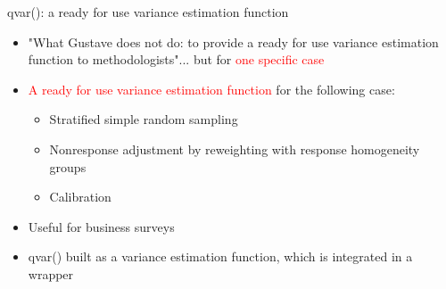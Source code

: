 \documentclass[xcolor=dvipsnames]{beamer}
\begin{document}
\begin{frame}{qvar(): a ready for use variance estimation function}

\begin{itemize}
    
    \item "What Gustave does not do: to provide a ready for use variance estimation function to methodologists"... but for \textcolor{red}{one specific case}

    \vspace{0.3 cm}

    \item \textcolor{red}{A ready for use variance estimation function} for the following case:
        \begin{itemize}
            \item Stratified simple random sampling
            \vspace{0.1 cm}
            \item Nonresponse adjustment by reweighting with response homogeneity groups
            \vspace{0.1 cm}
            \item Calibration
        \end{itemize}    
    
    \vspace{0.3 cm}
    
    \item Useful for business surveys
    
    \vspace{0.3 cm}

    \item qvar() built as a variance estimation function, which is integrated in a wrapper


\end{itemize}
    
\end{frame}
\end{document}
